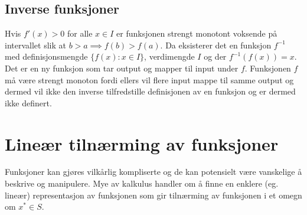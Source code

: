 \subsection{Inverse funksjoner}
Hvis $f'(x)>0$ for alle $x\in I$ er funksjonen strengt monotont voksende på intervallet slik at $b>a \implies f(b)>f(a)$. Da eksisterer det en funksjon $f^{-1}$ med definisjonsmengde $\{f(x):x\in I\}$, verdimengde $I$ og der $f^{-1}(f(x))=x$. Det er en ny funksjon som tar output og mapper til input under $f$. Funksjonen $f$ må være strengt monoton fordi ellers vil flere input mappe til samme output og dermed vil ikke den inverse tilfredstille definisjonen av en funksjon og er dermed ikke definert. 
\section{Lineær tilnærming av funksjoner}
Funksjoner kan gjøres vilkårlig kompliserte og de kan potensielt være vanskelige å beskrive og manipulere. Mye av kalkulus handler om å finne en enklere (eg. lineær) representasjon av funksjonen som gir tilnærming av funksjonen i et omegn om $x^* \in S$.

